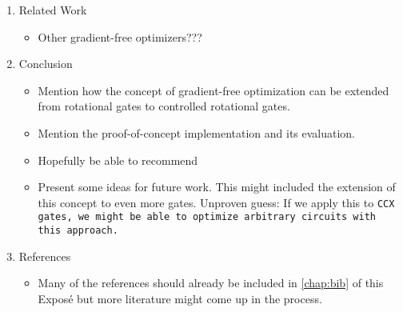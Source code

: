 \begin{enumerate}
    \item Related Work
    \begin{itemize}
        \item Other gradient-free optimizers???
    \end{itemize}

    \item Conclusion
    \begin{itemize}
        \item
            Mention how the concept of gradient-free optimization can be
            extended from rotational gates to controlled rotational gates.
        \item
            Mention the proof-of-concept implementation and its evaluation.
        \item
            Hopefully be able to recommend 
        \item
            Present some ideas for future work.
            This might included the extension of this concept to even more
            gates.
            Unproven guess:
            If we apply this to \tt{CCX} gates, we might be able to optimize
            arbitrary circuits with this approach.
    \end{itemize}

    \item References
    \begin{itemize}
        \item
            Many of the references should already be included in
            \autoref{chap:bib} of this Exposé but more literature might
            come up in the process. 
    \end{itemize}
\end{enumerate}

